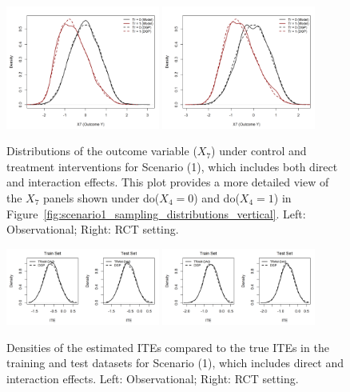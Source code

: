 \begin{figure}[htbp]
\centering
\includegraphics[width=0.45\textwidth]{img/results/observ_scenario1_X7_treatment_densities.png}
\includegraphics[width=0.45\textwidth]{img/results/rct_scenario1_X7_treatment_densities.png}
\caption{Distributions of the outcome variable ($X_7$) under control and treatment interventions for Scenario (1), which includes both direct and interaction effects. This plot provides a more detailed view of the $X_7$ panels shown under do($X_4=0$) and do($X_4=1$) in Figure~\ref{fig:scenario1_sampling_distributions_vertical}. Left: Observational; Right: RCT setting.}
\label{fig:scenario1_outcome_distributions}
\end{figure}




\begin{figure}[htbp]
\centering
\includegraphics[width=0.45\textwidth]{img/results/observ_scenario1_ITE_densities_train_test.png}
\includegraphics[width=0.45\textwidth]{img/results/rct_scenario1_ITE_densities_train_test.png}
\caption{Densities of the estimated ITEs compared to the true ITEs in the training and test datasets for Scenario (1), which includes direct and interaction effects. Left: Observational; Right: RCT setting.}
\label{fig:scenario1_ite_densities_train_test}
\end{figure}






